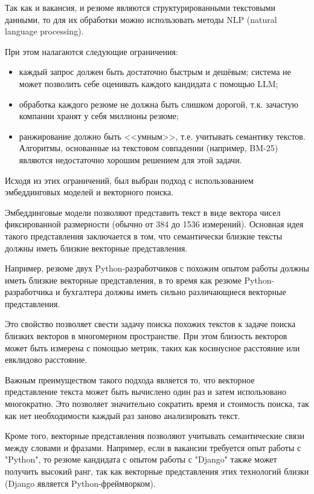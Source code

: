 \documentclass[14pt]{mmcs_article}
\begin{document}
Так как и вакансия, и резюме являются структурированными текстовыми данными, то для их обработки можно использовать методы NLP (natural language processing).

При этом налагаются следующие ограничения:

\begin{itemize}
  \item каждый запрос должен быть достаточно быстрым и дешёвым; система не может позволить себе оценивать каждого кандидата с помощью LLM;
  \item обработка каждого резюме не должна быть слишком дорогой, т.к. зачастую компании хранят у себя миллионы резюме;
  \item ранжирование должно быть <<умным>>, т.е. учитывать семантику текстов. Алгоритмы, основанные на текстовом совпадении (например, BM-25) являются недостаточно хорошим решением для этой задачи.
\end{itemize}

Исходя из этих ограничений, был выбран подход с использованием эмбеддинговых моделей и векторного поиска.

Эмбеддинговые модели позволяют представить текст в виде вектора чисел фиксированной размерности (обычно от 384 до 1536 измерений). Основная идея такого представления заключается в том, что семантически близкие тексты должны иметь близкие векторные представления.

Например, резюме двух Python-разработчиков с похожим опытом работы должны иметь близкие векторные представления, в то время как резюме Python-разработчика и бухгалтера должны иметь сильно различающиеся векторные представления.

Это свойство позволяет свести задачу поиска похожих текстов к задаче поиска близких векторов в многомерном пространстве. При этом близость векторов может быть измерена с помощью метрик, таких как косинусное расстояние или евклидово расстояние.

Важным преимуществом такого подхода является то, что векторное представление текста может быть вычислено один раз и затем использовано многократно. Это позволяет значительно сократить время и стоимость поиска, так как нет необходимости каждый раз заново анализировать текст.

Кроме того, векторные представления позволяют учитывать семантические связи между словами и фразами. Например, если в вакансии требуется опыт работы с "Python", то резюме кандидата с опытом работы с "Django" также может получить высокий ранг, так как векторные представления этих технологий близки (Django является Python-фреймворком).
\end{document}
